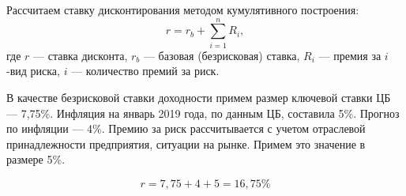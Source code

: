 Рассчитаем ставку дисконтирования методом кумулятивного построения:
\[ r = r_b + \sum\limits_{i=1}^{n} R_i, \]
где  $r$ --- ставка дисконта,
$r_b$ --- базовая (безрисковая) ставка,
$R_i$ --- премия за $i$-вид риска,
$i$ --- количество премий за риск.

В качестве безрисковой ставки доходности примем размер ключевой ставки ЦБ --- 7,75\%. 
Инфляция на январь 2019 года, по данным ЦБ, составила 5\%. Прогноз по инфляции --- 4\%.
Премию за риск рассчитывается с учетом отраслевой принадлежности предприятия, ситуации на рынке. Примем это значение в размере 5\%.

\[ r = 7,75  + 4 + 5 = 16,75 \%\]













